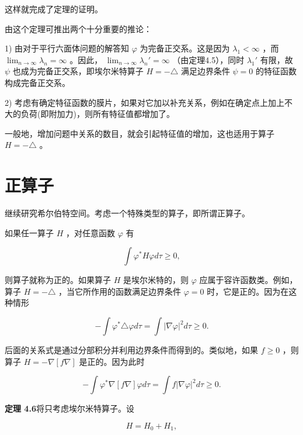 这样就完成了定理的证明。

由这个定理可推出两个十分重要的推论：

1) 由对于平行六面体问题的解答知 $\varphi$ 为完备正交系。这是因为 $\lambda_{1} < \infty$ ，而 $\lim_{n \to \infty} \lambda_{n} = \infty$ 。因此， $\lim_{n \to \infty} \lambda_{n}' = \infty$ （由定理4.5），同时 $\lambda_{1}'$ 有限，故 $\psi$ 也成为完备正交系，即埃尔米特算子 $H = -\triangle$ 满足边界条件 $\psi = 0$ 的特征函数构成完备正交系。

2) 考虑有确定特征函数的膜片，如果对它加以补充关系，例如在确定点上加上不大的负荷(即附加力)，则所有特征值都增加了。

一般地，增加问题中关系的数目，就会引起特征值的增加，这也适用于算子 $H = -\triangle$ 。

\section{正算子}

继续研究希尔伯特空间。考虑一个特殊类型的算子，即所谓正算子。

如果任一算子 $H$ ，对任意函数 $\varphi$ 有

\begin{equation*}
\int \varphi^ {*} H \varphi d \tau \geqslant 0,\tag{4.48}
\end{equation*}

则算子就称为正的。如果算子 $H$ 是埃尔米特的，则 $\varphi$ 应属于容许函数类。例如，算子 $H = -\triangle$ ，当它所作用的函数满足边界条件 $\varphi = 0$ 时，它是正的。因为在这种情形

\begin{equation*}
- \int \varphi^ {*} \triangle \varphi d \tau = \int | \nabla \varphi | ^ {2} d \tau \geqslant 0.
\end{equation*}

后面的关系式是通过分部积分并利用边界条件而得到的。类似地，如果 $f \geqslant 0$ ，则算子 $H = -\nabla [f\nabla ]$ 是正的。因为此时

\begin{equation*}
- \int \varphi^ {*} \nabla [ f \nabla ] \varphi d \tau = \int f | \nabla \varphi | ^ {2} d \tau \geqslant 0.
\end{equation*}

\textbf{定理 4.6}\quad 将只考虑埃尔米特算子。设

\begin{equation*}
H = H _ {0} + H _ {1},\tag{4.49}
\end{equation*}

